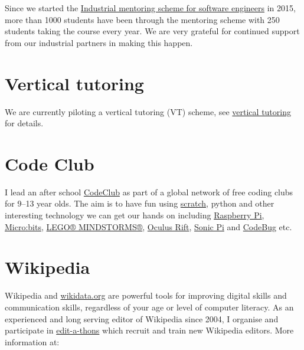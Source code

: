 \documentclass[12pt,]{book}
\begin{document}
Since we started the \href{https://www.cs.manchester.ac.uk/connect/business-engagement/industrial-mentoring/}{Industrial mentoring scheme for software engineers} in 2015, more than 1000 students have been through the mentoring scheme with 250 students taking the course every year. We are very grateful for continued support from our industrial partners in making this happen.

\hypertarget{vertical-tutoring}{%
\section{Vertical tutoring}\label{vertical-tutoring}}

We are currently piloting a vertical tutoring (VT) scheme, see \protect\hyperlink{vertical-tutoring-1}{vertical tutoring} for details.

\hypertarget{codeclub}{%
\section{Code Club}\label{codeclub}}

I lead an after school \href{https://codeclub.org}{CodeClub} as part of a global network of free coding clubs for 9--13 year olds. \citep{codeclub} The aim is to have fun using \href{https://scratch.mit.edu/}{scratch}, \citep{Resnick2009} python and other interesting technology we can get our hands on including \href{https://www.raspberrypi.org/}{Raspberry Pi}, \href{https://microbit.org/}{Micro:bits}, \href{https://www.lego.com/en-gb/themes/mindstorms}{LEGO® MINDSTORMS®}, \href{https://www.oculus.com}{Oculus Rift}, \href{https://sonic-pi.net/}{Sonic Pi} and \href{http://www.codebug.org.uk/}{CodeBug} etc.

\hypertarget{wikipedia}{%
\section{Wikipedia}\label{wikipedia}}

Wikipedia and \href{https://www.wikidata.org}{wikidata.org} \citep{Vrandecic2014} \citep{Turki2019} are powerful tools for improving digital skills and communication skills, regardless of your age or level of computer literacy. \citep{Proffitt2018} \citep{goodfaith} As an experienced and long serving editor of Wikipedia since 2004, I organise and participate in \href{https://en.wikipedia.org/wiki/Edit-a-thon}{edit-a-thons} which recruit and train new Wikipedia editors.\citep{goodbadugly} \citep{troubled} More information at:
\end{document}
